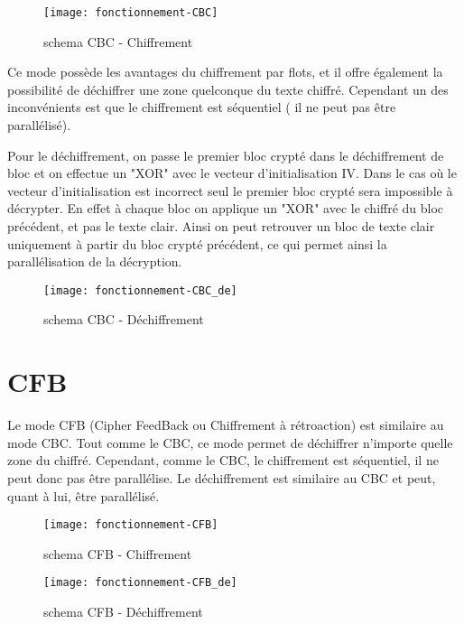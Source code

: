 \begin{figure}[!h]
  \centering
  \texttt{[image: fonctionnement-CBC]}
  \caption{schema CBC - Chiffrement \cite{wiki}}
  \label{schema CBC - Chiffrement}
\end{figure}

Ce mode possède les avantages du chiffrement par flots, et il offre également la possibilité de déchiffrer une zone quelconque du texte chiffré. Cependant un des inconvénients est que le chiffrement est séquentiel ( \cad il ne peut pas être parallélisé).

Pour le déchiffrement, on passe le premier bloc crypté dans le déchiffrement de bloc et on effectue un "XOR" avec le vecteur d'initialisation IV. Dans le cas où le vecteur d'initialisation est incorrect seul le premier bloc crypté sera impossible à décrypter. En effet à chaque bloc on applique un "XOR" avec le chiffré du bloc précédent, et pas le texte clair. Ainsi on peut retrouver un bloc de texte clair uniquement à partir du bloc crypté précédent, ce qui permet ainsi la parallélisation de la décryption. 

\begin{figure}[!h]
  \centering
  \texttt{[image: fonctionnement-CBC\_de]}
  \caption{schema CBC - Déchiffrement}
  \label{schema CBC - Déchiffrement}
\end{figure}




\section{CFB}
Le mode CFB (Cipher FeedBack ou Chiffrement à rétroaction) est similaire au mode CBC. Tout comme le CBC, ce mode permet de déchiffrer n'importe quelle zone du chiffré. Cependant, comme le CBC, le chiffrement est séquentiel, il ne peut donc pas être parallélise. Le déchiffrement est similaire au CBC et peut, quant à lui, être parallélisé. 

\begin{figure}[!h]
  \centering
  \texttt{[image: fonctionnement-CFB]}
  \caption{schema CFB - Chiffrement}
  \label{schema CFB - Chiffrement}
\end{figure}

\begin{figure}[!h]
  \centering
  \texttt{[image: fonctionnement-CFB\_de]}
  \caption{schema CFB - Déchiffrement}
  \label{schema CFB - Déchiffrement}
\end{figure}

